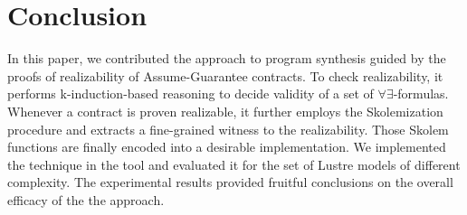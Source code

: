 \section{Conclusion}
\label{sec:conclusion}
In this paper, we contributed the approach to program synthesis guided by the proofs of realizability of Assume-Guarantee contracts.
To check realizability, it performs k-induction-based reasoning to decide validity of a set of $\forall\exists$-formulas.
Whenever a contract is proven realizable, it further employs the Skolemization procedure and extracts a fine-grained witness to the realizability.
Those Skolem functions are finally encoded into a desirable implementation.
We implemented the technique in the \jkindsynt tool and evaluated it for the set
of Lustre models of different complexity.
The experimental results provided fruitful conclusions on the overall efficacy of the the approach.
